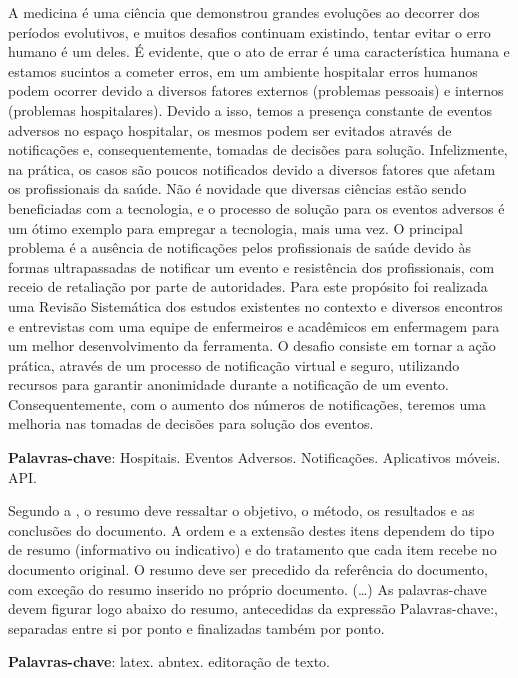 \setlength{\absparsep}{18pt} %
\begin{resumo}
 
A medicina é uma ciência que demonstrou grandes evoluções ao decorrer dos períodos evolutivos, e muitos desafios continuam existindo, tentar evitar o erro humano é um deles. É evidente, que o ato de errar é uma característica humana e estamos sucintos a cometer erros, em um ambiente hospitalar erros humanos podem ocorrer devido a diversos fatores externos (problemas pessoais) e internos (problemas hospitalares). Devido a isso, temos a presença constante de eventos adversos no espaço hospitalar, os mesmos podem ser evitados através de notificações e, consequentemente, tomadas de decisões para solução. Infelizmente, na prática, os casos são poucos notificados devido a diversos fatores que afetam os profissionais da saúde. Não é novidade que diversas ciências estão sendo beneficiadas com a tecnologia, e o processo de solução para os eventos adversos é um ótimo exemplo para empregar a tecnologia, mais uma vez. O principal problema é a ausência de notificações pelos profissionais de saúde devido às formas ultrapassadas de notificar um evento e resistência dos profissionais, com receio de retaliação por parte de autoridades. Para este propósito foi realizada uma Revisão Sistemática dos estudos existentes no contexto e diversos encontros e entrevistas com uma equipe de enfermeiros e acadêmicos em enfermagem para um melhor desenvolvimento da ferramenta. O desafio consiste em tornar a ação prática, através de um processo de notificação virtual e seguro, utilizando recursos para garantir anonimidade durante a notificação de um evento. Consequentemente, com o aumento dos números de notificações, teremos uma melhoria nas tomadas de decisões para solução dos eventos.

 \textbf{Palavras-chave}: Hospitais. Eventos Adversos. Notificações. Aplicativos móveis. API.
 
 
 Segundo a , o resumo deve ressaltar o objetivo, o método, os resultados e as conclusões do documento. A ordem e a extensão destes itens dependem do tipo de resumo (informativo ou indicativo) e do tratamento que cada item recebe no documento original. O resumo deve ser precedido da referência do documento, com exceção do resumo inserido no próprio documento. (\ldots) As palavras-chave devem figurar logo abaixo do resumo, antecedidas da expressão Palavras-chave:, separadas entre si por ponto e finalizadas também por ponto.

 \textbf{Palavras-chave}: latex. abntex. editoração de texto.
\end{resumo}